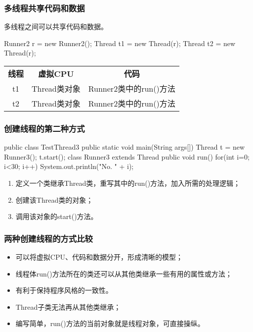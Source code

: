 \begin{frame}[fragile] %
\frametitle{多线程共享代码和数据}

多线程之间可以共享代码和数据。
\begin{javaCode}
Runner2 r = new Runner2();
Thread t1 = new Thread(r);
Thread t2 = new Thread(r);
\end{javaCode}
\begin{table}
\footnotesize
\setlength{\extrarowheight}{1.2mm}
\begin{tabular}{c|c|c}
{\bf 线程} & {\bf 虚拟CPU} & {\bf 代码} \\
t1 & Thread类对象 & Runner2类中的run()方法 \\
t2 & Thread类对象 & Runner2类中的run()方法 \\
\end{tabular}
\end{table}
\end{frame}

\begin{frame}[fragile] %
\frametitle{创建线程的第二种方式}

\begin{javaCode}
public class TestThread3 {
  public static void main(String args[]) {
    Thread t = new Runner3();
    t.start();
  }
}
class Runner3 extends Thread {
  public void run() {
    for(int i=0; i<30; i++) {
      System.out.println("No. " + i);
    }
  }
}
\end{javaCode}
\begin{enumerate}
\item 定义一个类继承Thread类，重写其中的run()方法，加入所需的处理逻辑；
\item 创建该Thread类的对象；
\item 调用该对象的start()方法。
\end{enumerate}
\end{frame}

\begin{frame}[fragile] %
\frametitle{两种创建线程的方式比较}
\begin{itemize}
\item 可以将虚拟CPU、代码和数据分开，形成清晰的模型；
\item 线程体run()方法所在的类还可以从其他类继承一些有用的属性或方法；
\item 有利于保持程序风格的一致性。
\end{itemize}
\begin{itemize}
\item Thread子类无法再从其他类继承；
\item 编写简单，run()方法的当前对象就是线程对象，可直接操纵。
\end{itemize}
\end{frame}


